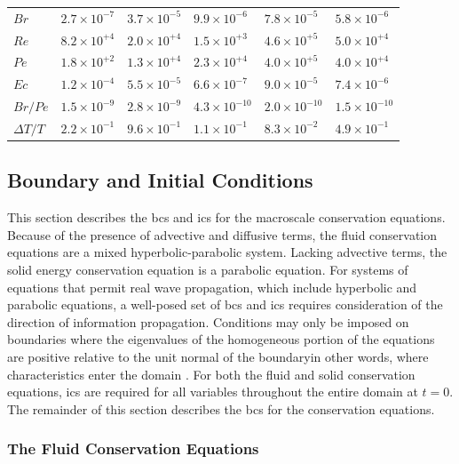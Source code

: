 \begin{table}[!h]
\begin{tabular}{|l |l l l l l|}
 \(Br\)							& \(2.7\times10^{-7}\)& \(3.7\times10^{-5}\)	& \(9.9\times10^{-6}\)	& \(7.8\times10^{-5}\)	& \(5.8\times10^{-6}\)\\
 \(Re\)							& \(8.2\times10^{+4}\)	& \(2.0\times10^{+4}\)		& \(1.5\times10^{+3}\)		& \(4.6\times10^{+5}\)		& \(5.0\times10^{+4}\)\\
 \(Pe\)							& \(1.8\times10^{+2}\)	& \(1.3\times10^{+4}\)		& \(2.3\times10^{+4}\)		& \(4.0\times10^{+5}\)		& \(4.0\times10^{+4}\)\\
 \(Ec\) & \(1.2\times10^{-4}\) & \(5.5\times10^{-5}\) & \(6.6\times10^{-7}\) & \(9.0\times10^{-5}\) & \(7.4\times10^{-6}\)\\
 \(Br/Pe\)							& \(1.5\times10^{-9}\)& \(2.8\times10^{-9}\)	& \(4.3\times10^{-10}\)	& \(2.0\times10^{-10}\)	& \(1.5\times10^{-10}\)\\
 \(\Delta T/T\) & \(2.2\times10^{-1}\) & \(9.6\times10^{-1}\) & \(1.1\times10^{-1}\) & \(8.3\times10^{-2}\) & \(4.9\times10^{-1}\)\Bstrut\\
\hline
\end{tabular}
\label{table:TypicalData}
\end{table}

\subsection{Boundary and Initial Conditions}
\label{sec:BCs}

This section describes the \glspl{bc} and \glspl{ic} for the macroscale conservation equations. Because of the presence of advective and diffusive terms, the fluid conservation equations are a mixed hyperbolic-parabolic system. Lacking advective terms, the solid energy conservation equation is a parabolic equation. For systems of equations that permit real wave propagation, which include hyperbolic and parabolic equations, a well-posed set of \glspl{bc} and \glspl{ic} requires consideration of the direction of information propagation. Conditions may only be imposed on boundaries where the eigenvalues of the homogeneous portion of the equations are positive relative to the unit normal of the boundary\mdash  in other words, where characteristics enter the domain \cite{hirsch}. For both the fluid and solid conservation equations, \glspl{ic} are required for all variables throughout the entire domain at \(t=0\). The remainder of this section describes the \glspl{bc} for the conservation equations.

\subsubsection{The Fluid Conservation Equations}

